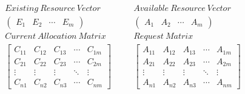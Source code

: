 \documentclass[border=10pt,margin=5pt,tikz,dvisvgm,rgb,utf8]{standalone}
\begin{document}
\renewcommand{\baselinestretch}{0.4}

\begin{align*}
  Existing\ Resource\ Vector & \quad & Available\ Resource\ Vector \\
  \begin{pmatrix}
    E_{1} & E_{2} & \cdots & E_{m}
  \end{pmatrix}& \quad &
  \begin{pmatrix}
    A_{1} & A_{2} & \cdots & A_{m}
  \end{pmatrix} \\
  Current\ Allocation\ Matrix & & Request\ Matrix \\
  \begin{bmatrix}
    C_{11} & C_{12} & C_{13} & \cdots & C_{1m} \\
    C_{21} & C_{22} & C_{23} & \cdots & C_{2m} \\
    \vdots & \vdots & \vdots & \ddots & \vdots \\
    C_{n1} & C_{n2} & C_{n3} & \cdots & C_{nm}
  \end{bmatrix} & &
  \begin{bmatrix}
    A_{11} & A_{12} & A_{13} & \cdots & A_{1m} \\
    A_{21} & A_{22} & A_{23} & \cdots & A_{2m} \\
    \vdots & \vdots & \vdots & \ddots & \vdots \\
    A_{n1} & A_{n2} & A_{n3} & \cdots & A_{nm}
  \end{bmatrix}
\end{align*}
\end{document}
